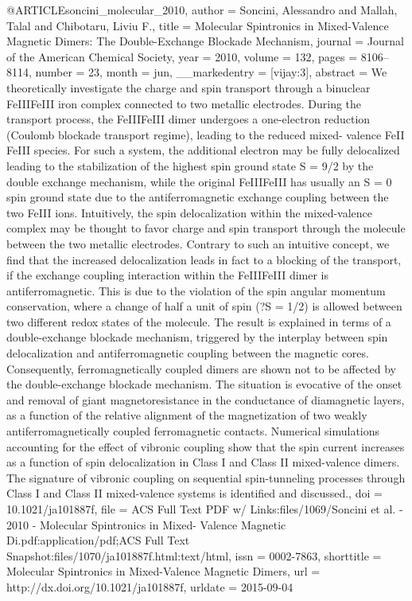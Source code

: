 @ARTICLE{soncini_molecular_2010,
  author = {Soncini, Alessandro and Mallah, Talal and Chibotaru, Liviu F.},
  title = {Molecular {Spintronics} in {Mixed}-{Valence} {Magnetic} {Dimers}:
	{The} {Double}-{Exchange} {Blockade} {Mechanism}},
  journal = {Journal of the American Chemical Society},
  year = {2010},
  volume = {132},
  pages = {8106--8114},
  number = {23},
  month = jun,
  __markedentry = {[vijay:3]},
  abstract = {We theoretically investigate the charge and spin transport through
	a binuclear FeIIIFeIII iron complex connected to two metallic electrodes.
	During the transport process, the FeIIIFeIII dimer undergoes a one-electron
	reduction (Coulomb blockade transport regime), leading to the reduced
	mixed- valence FeII FeIII species. For such a system, the additional
	electron may be fully delocalized leading to the stabilization of
	the highest spin ground state S = 9/2 by the double exchange mechanism,
	while the original FeIIIFeIII has usually an S = 0 spin ground state
	due to the antiferromagnetic exchange coupling between the two FeIII
	ions. Intuitively, the spin delocalization within the mixed-valence
	complex may be thought to favor charge and spin transport through
	the molecule between the two metallic electrodes. Contrary to such
	an intuitive concept, we find that the increased delocalization leads
	in fact to a blocking of the transport, if the exchange coupling
	interaction within the FeIIIFeIII dimer is antiferromagnetic. This
	is due to the violation of the spin angular momentum conservation,
	where a change of half a unit of spin (?S = 1/2) is allowed between
	two different redox states of the molecule. The result is explained
	in terms of a double-exchange blockade mechanism, triggered by the
	interplay between spin delocalization and antiferromagnetic coupling
	between the magnetic cores. Consequently, ferromagnetically coupled
	dimers are shown not to be affected by the double-exchange blockade
	mechanism. The situation is evocative of the onset and removal of
	giant magnetoresistance in the conductance of diamagnetic layers,
	as a function of the relative alignment of the magnetization of two
	weakly antiferromagnetically coupled ferromagnetic contacts. Numerical
	simulations accounting for the effect of vibronic coupling show that
	the spin current increases as a function of spin delocalization in
	Class I and Class II mixed-valence dimers. The signature of vibronic
	coupling on sequential spin-tunneling processes through Class I and
	Class II mixed-valence systems is identified and discussed.},
  doi = {10.1021/ja101887f},
  file = {ACS Full Text PDF w/ Links:files/1069/Soncini et al. - 2010 - Molecular Spintronics in Mixed- Valence Magnetic Di.pdf:application/pdf;ACS Full Text Snapshot:files/1070/ja101887f.html:text/html},
  issn = {0002-7863},
  shorttitle = {Molecular {Spintronics} in {Mixed}-{Valence} {Magnetic} {Dimers}},
  url = {http://dx.doi.org/10.1021/ja101887f},
  urldate = {2015-09-04}
}

